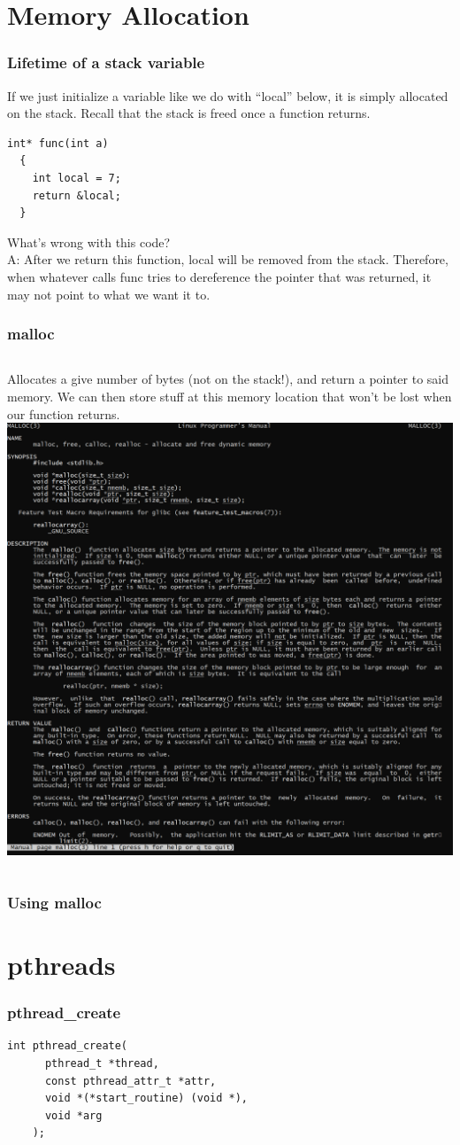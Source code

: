 \documentclass{beamer}
\begin{document}
\section{Memory Allocation}
\begin{frame}[fragile]
  \frametitle{Lifetime of a stack variable}
  If we just initialize a variable like we do with ``local'' below, it is simply allocated on the stack. Recall that the stack is freed once a function returns.
  \begin{lstlisting}[style=customc]
  int* func(int a)
  {
    int local = 7;
    return &local;
  }
  \end{lstlisting}
  What's wrong with this code?\\
  \pause
  A: After we return this function, local will be removed from the stack. Therefore, when whatever calls func tries to dereference the pointer that was returned, it may not point to what we want it to.
\end{frame}
\begin{frame}
  \frametitle{malloc}
  \begin{columns}[c]
      Allocates a give number of bytes (not on the stack!), and return a pointer to said memory. We can then store stuff at this memory location that won't be lost when our function returns.
      \includegraphics[width=\textwidth,height=\textheight,keepaspectratio]{manmalloc.png}
  \end{columns}
\end{frame}
\begin{frame}
  \frametitle{Using malloc}
\end{frame}
\section{pthreads}
\begin{frame}[fragile]
  \frametitle{pthread\_create}
  \begin{lstlisting}[style=customc]
    int pthread_create(
      pthread_t *thread, 
      const pthread_attr_t *attr, 
      void *(*start_routine) (void *), 
      void *arg
    );
  \end{lstlisting}
\end{frame}
\end{document}
